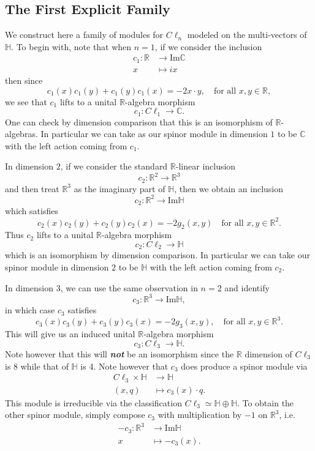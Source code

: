 \documentclass[openany, 11pt]{article}
\theoremstyle{definition}
\theoremstyle{remark}
\def\bC{\ensuremath{\mathbb{C}}}
\def\bH{\ensuremath{\mathbb{H}}}
\def\bR{\ensuremath{\mathbb{R}}}
\begin{document}
\subsection{The First Explicit Family}
We construct here a family of modules for $C\ell_n$ modeled on the multi-vectors of $\bH$. To begin with, note that when $n=1$, if we consider the inclusion
\begin{align*}
    c_1:\bR&\rightarrow \text{Im}\bC\\
    x&\mapsto ix
\end{align*}
then since 
\[
    c_1(x)c_1(y)+c_1(y)c_1(x)=-2x\cdot y,\quad \text{for all } x,y\in\bR,
\]
we see that $c_1$ lifts to a unital $\bR$-algebra morphism
\[
    c_1:C\ell_1\rightarrow \bC.
\]
One can check by dimension comparison that this is an isomorphism of $\bR$-algebras. In particular we can take as our spinor module in dimension $1$ to be $\bC$ with the left action coming from $c_1$.\par
In dimension $2$, if we consider the standard $\bR$-linear inclusion 
\[
    c_2:\bR^2\rightarrow \bR^3
\]
and then treat $\bR^3$ as the imaginary part of $\bH$, then we obtain an inclusion 
\[
    c_2:\bR^2\rightarrow \text{Im}\bH
\]
which satisfies 
\[
    c_2(x)c_2(y)+c_2(y)c_2(x)=-2g_2(x,y)\quad \text{for all }x,y\in\bR^2.
\]
Thus $c_2$ lifts to a unital $\bR$-algebra morphism
\[
    c_2:C\ell_2\rightarrow\bH
\]
which is an isomorphism by dimension comparison. In particular we can take our spinor module in dimension $2$ to be $\bH$ with the left action coming from $c_2$.\par
In dimension $3$, we can use the same observation in $n=2$ and identify
\[
    c_3:\bR^3\rightarrow \text{Im}\bH,
\]
in which case $c_3$ satisfies 
\[
    c_3(x)c_3(y)+c_3(y)c_3(x)=-2g_3(x,y),\quad \text{for all }x,y\in\bR^3.
\]
This will give us an induced unital $\bR$-algebra morphism
\[
    c_3:C\ell_3\rightarrow \bH.
\]
Note however that this will \textbf{\emph{not}} be an isomorphism since the $\bR$ dimension of $C\ell_3$ is $8$ while that of $\bH$ is 4. Note however that $c_3$ does produce a spinor module via
\begin{align*}
    C\ell_3\times \bH&\rightarrow \bH\\
    (x,q)&\mapsto c_3(x)\cdot q.
\end{align*}
This module is irreducible via the classification $C\ell_3\simeq \bH\oplus\bH$. To obtain the other spinor module, simply compose $c_3$ with multiplication by $-1$ on $\bR^3$, i.e.
\begin{align*}
   -c_3:\bR^3&\rightarrow\text{Im}\bH\\
    x&\mapsto -c_3(x).
\end{align*}
\end{document}
